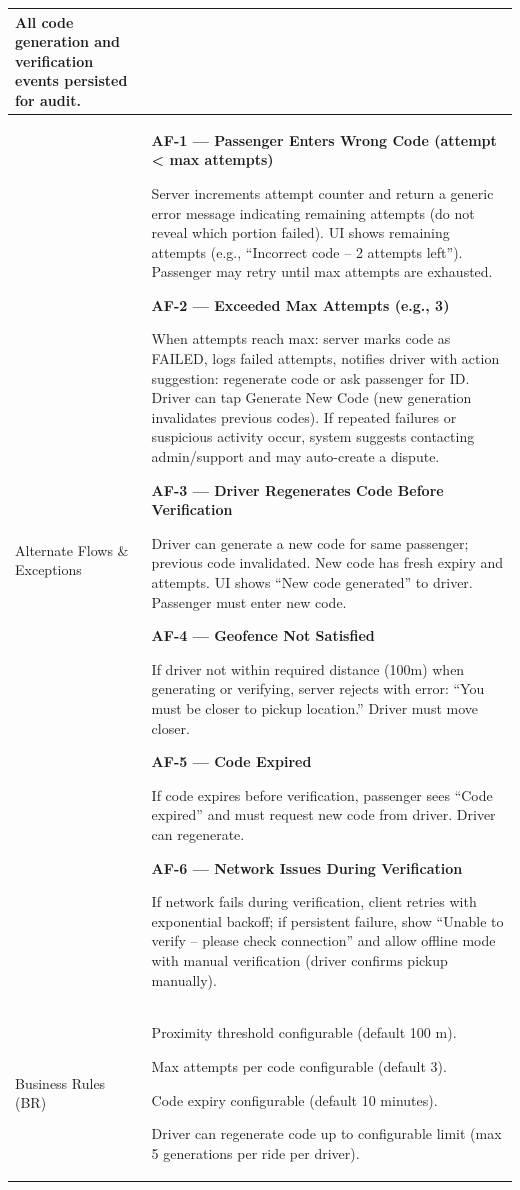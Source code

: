 \begin{longtable}{|p{3.5cm}|p{12cm}|}
All code generation and verification events persisted for audit. \\
\hline
Alternate Flows \& Exceptions &
\textbf{AF-1 --- Passenger Enters Wrong Code (attempt < max attempts)}

Server increments attempt counter and return a generic error message indicating remaining attempts (do not reveal which portion failed). UI shows remaining attempts (e.g., “Incorrect code – 2 attempts left”). Passenger may retry until max attempts are exhausted.

\textbf{AF-2 --- Exceeded Max Attempts (e.g., 3)}

When attempts reach max: server marks code as FAILED, logs failed attempts, notifies driver with action suggestion: regenerate code or ask passenger for ID. Driver can tap Generate New Code (new generation invalidates previous codes). If repeated failures or suspicious activity occur, system suggests contacting admin/support and may auto-create a dispute.

\textbf{AF-3 --- Driver Regenerates Code Before Verification}

Driver can generate a new code for same passenger; previous code invalidated. New code has fresh expiry and attempts. UI shows “New code generated” to driver. Passenger must enter new code.

\textbf{AF-4 --- Geofence Not Satisfied}

If driver not within required distance (100m) when generating or verifying, server rejects with error: “You must be closer to pickup location.” Driver must move closer.

\textbf{AF-5 --- Code Expired}

If code expires before verification, passenger sees “Code expired” and must request new code from driver. Driver can regenerate.

\textbf{AF-6 --- Network Issues During Verification}

If network fails during verification, client retries with exponential backoff; if persistent failure, show “Unable to verify – please check connection” and allow offline mode with manual verification (driver confirms pickup manually). \\
\hline
Business Rules (BR) &
Proximity threshold configurable (default 100 m).

Max attempts per code configurable (default 3).

Code expiry configurable (default 10 minutes).

Driver can regenerate code up to configurable limit (max 5 generations per ride per driver).


\end{longtable}

